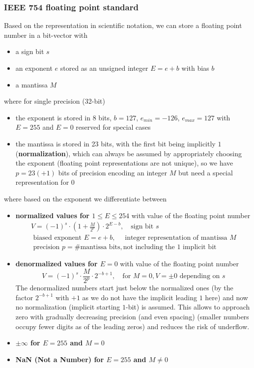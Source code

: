 \subsubsection{IEEE 754 floating point standard}
Based on the representation in scientific notation, we can store a floating point number in a bit-vector with
\begin{itemize}
    \item a sign bit $s$
    \item an exponent $e$ stored as an unsigned integer $E = e + b$ with bias $b$
    \item a mantissa $M$
\end{itemize}
where for single precision (32-bit)
\begin{itemize}
    \item the exponent is stored in 8 bits, $b = 127$, $e_{min} = -126$, $e_{max} = 127$ with $E = 255$ and $E = 0$ reserved for special cases
    \item the mantissa is stored in 23 bits, with the first bit being implicitly $1$ (\textbf{normalization}), which can always be assumed by appropriately choosing the exponent (floating point representations are not unique), so we have $p = 23(+1)$ bits of precision encoding an integer $M$ but need a special representation for $0$
\end{itemize}
where based on the exponent we differentiate between
\begin{itemize}
    \item \textbf{normalized values for $1 \leq E \leq 254$}  with value of the floating point number
    \begin{equation}
        \begin{multlined}
            V = (-1)^s \cdot \left(1 + \frac{M}{2^p}\right) \cdot 2^{E-b}, \quad \text{sign bit } s\\
            \text{ biased exponent } E = e + b, \quad \text{ integer representation of mantissa } M \\
            \text{ precision } p = \#\text{mantissa bits}, \text{not including the } 1 \text{ implicit bit}
        \end{multlined}
    \end{equation}
    \item \textbf{denormalized values for $E = 0$} with value of the floating point number
    \begin{equation}
        V = (-1)^s \cdot \frac{M}{2^p} \cdot 2^{-b + 1},  \quad \text{for } M = 0, V = \pm 0 \text{ depending on } s
    \end{equation}
    The denormalized numbers start just below the normalized ones (by the factor $2^{-b + 1}$ with $+1$ as we do not have the implicit leading $1$ here) and now no normalization (implicit starting $1$-bit) is assumed. This 
    allows to approach zero with gradually decreasing precision (and even spacing) (smaller numbers occupy fewer digits as of the leading zeros) and reduces the risk of underflow.
    \item \textbf{$\pm \infty$ for $E = 255$ and $M = 0$}
    \item \textbf{NaN (Not a Number) for $E = 255$ and $M \ne 0$}
\end{itemize}

